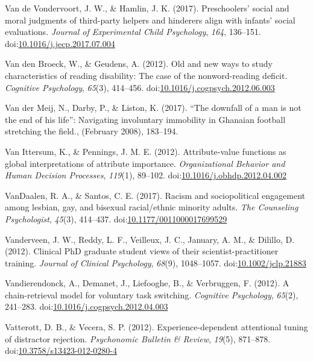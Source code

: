 \documentclass[english,man]{apa6}
\theoremstyle{definition}
\theoremstyle{definition}
\theoremstyle{definition}
\theoremstyle{remark}
\begin{document}
\hypertarget{ref-VandeVondervoort2017}{}
Van de Vondervoort, J. W., \& Hamlin, J. K. (2017). Preschoolers' social
and moral judgments of third-party helpers and hinderers align with
infants' social evaluations. \emph{Journal of Experimental Child
Psychology}, \emph{164}, 136--151.
doi:\href{https://doi.org/10.1016/j.jecp.2017.07.004}{10.1016/j.jecp.2017.07.004}

\hypertarget{ref-VandenBroeck2012}{}
Van den Broeck, W., \& Geudens, A. (2012). Old and new ways to study
characteristics of reading disability: The case of the nonword-reading
deficit. \emph{Cognitive Psychology}, \emph{65}(3), 414--456.
doi:\href{https://doi.org/10.1016/j.cogpsych.2012.06.003}{10.1016/j.cogpsych.2012.06.003}

\hypertarget{ref-Darby2017}{}
Van der Meij, N., Darby, P., \& Liston, K. (2017). ``The downfall of a
man is not the end of his life'': Navigating involuntary immobility in
Ghanaian football stretching the field., (February 2008), 183--194.

\hypertarget{ref-VanIttersum2012}{}
Van Ittersum, K., \& Pennings, J. M. E. (2012). Attribute-value
functions as global interpretations of attribute importance.
\emph{Organizational Behavior and Human Decision Processes},
\emph{119}(1), 89--102.
doi:\href{https://doi.org/10.1016/j.obhdp.2012.04.002}{10.1016/j.obhdp.2012.04.002}

\hypertarget{ref-VanDaalen2017}{}
VanDaalen, R. A., \& Santos, C. E. (2017). Racism and sociopolitical
engagement among lesbian, gay, and bisexual racial/ethnic minority
adults. \emph{The Counseling Psychologist}, \emph{45}(3), 414--437.
doi:\href{https://doi.org/10.1177/0011000017699529}{10.1177/0011000017699529}

\hypertarget{ref-Vanderveen2012}{}
Vanderveen, J. W., Reddy, L. F., Veilleux, J. C., January, A. M., \&
Dilillo, D. (2012). Clinical PhD graduate student views of their
scientist-practitioner training. \emph{Journal of Clinical Psychology},
\emph{68}(9), 1048--1057.
doi:\href{https://doi.org/10.1002/jclp.21883}{10.1002/jclp.21883}

\hypertarget{ref-Vandierendonck2012}{}
Vandierendonck, A., Demanet, J., Liefooghe, B., \& Verbruggen, F.
(2012). A chain-retrieval model for voluntary task switching.
\emph{Cognitive Psychology}, \emph{65}(2), 241--283.
doi:\href{https://doi.org/10.1016/j.cogpsych.2012.04.003}{10.1016/j.cogpsych.2012.04.003}

\hypertarget{ref-Vatterott2012}{}
Vatterott, D. B., \& Vecera, S. P. (2012). Experience-dependent
attentional tuning of distractor rejection. \emph{Psychonomic Bulletin
\& Review}, \emph{19}(5), 871--878.
doi:\href{https://doi.org/10.3758/s13423-012-0280-4}{10.3758/s13423-012-0280-4}
\end{document}
